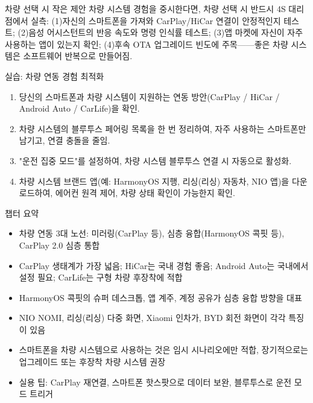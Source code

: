 \begin{tcbinfo}{차량 선택 시 작은 제안}
차량 시스템 경험을 중시한다면, 차량 선택 시 반드시 4S 대리점에서 실측: (1)자신의 스마트폰을 가져와 CarPlay/HiCar 연결이 안정적인지 테스트; (2)음성 어시스턴트의 반응 속도와 명령 인식률 테스트; (3)앱 마켓에 자신이 자주 사용하는 앱이 있는지 확인; (4)후속 OTA 업그레이드 빈도에 주목——좋은 차량 시스템은 소프트웨어 반복으로 만들어짐.

\end{tcbinfo}

\begin{tcbpractice}{실습: 차량 연동 경험 최적화}
\begin{enumerate}
  \item 당신의 스마트폰과 차량 시스템이 지원하는 연동 방안(CarPlay / HiCar / Android Auto / CarLife)을 확인.
  \item 차량 시스템의 블루투스 페어링 목록을 한 번 정리하여, 자주 사용하는 스마트폰만 남기고, 연결 충돌을 줄임.
  \item "운전 집중 모드"를 설정하여, 차량 시스템 블루투스 연결 시 자동으로 활성화.
  \item 차량 시스템 브랜드 앱(예: HarmonyOS 지행, 리싱(리싱) 자동차, NIO 앱)을 다운로드하여, 에어컨 원격 제어, 차량 상태 확인이 가능한지 확인.
\end{enumerate}

\end{tcbpractice}

\begin{tcbsummary}{챕터 요약}
\begin{itemize}
  \item 차량 연동 3대 노선: 미러링(CarPlay 등), 심층 융합(HarmonyOS 콕핏 등), CarPlay 2.0 심층 통합
  \item CarPlay 생태계가 가장 넓음; HiCar는 국내 경험 좋음; Android Auto는 국내에서 설정 필요; CarLife는 구형 차량 후장착에 적합
  \item HarmonyOS 콕핏의 슈퍼 데스크톱, 앱 계주, 계정 공유가 심층 융합 방향을 대표
  \item NIO NOMI, 리싱(리싱) 다중 화면, Xiaomi 인차가, BYD 회전 화면이 각각 특징이 있음
  \item 스마트폰을 차량 시스템으로 사용하는 것은 임시 시나리오에만 적합, 장기적으로는 업그레이드 또는 후장착 차량 시스템 권장
  \item 실용 팁: CarPlay 재연결, 스마트폰 핫스팟으로 데이터 보완, 블루투스로 운전 모드 트리거
\end{itemize}

\end{tcbsummary}
